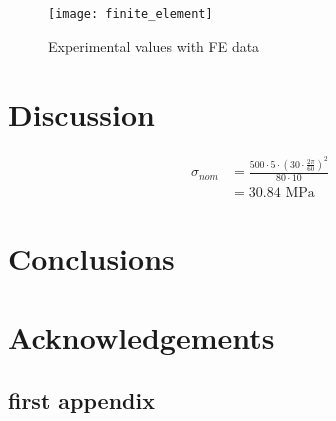 \documentclass[12pt]{labreport}
\begin{document}
\begin{figure}[h]
    \centering
    \texttt{[image: finite\_element]}
    \caption{Experimental values with FE data}
    \label{fig:finite_element}
\end{figure}

\section{Discussion}
\begin{equation}
\begin{split}
    \sigma_{nom} & = \frac{500\cdot5\cdot(30\cdot\frac{2\pi}{60})^2}{80\cdot10} \\
                 & = 30.84 \text{ MPa}
\end{split}
\end{equation}

\section{Conclusions}

\section{Acknowledgements}



\backmatter
\begin{appendices}
\appendix
{}
\section{first appendix}

    
\end{appendices}
\end{document}
